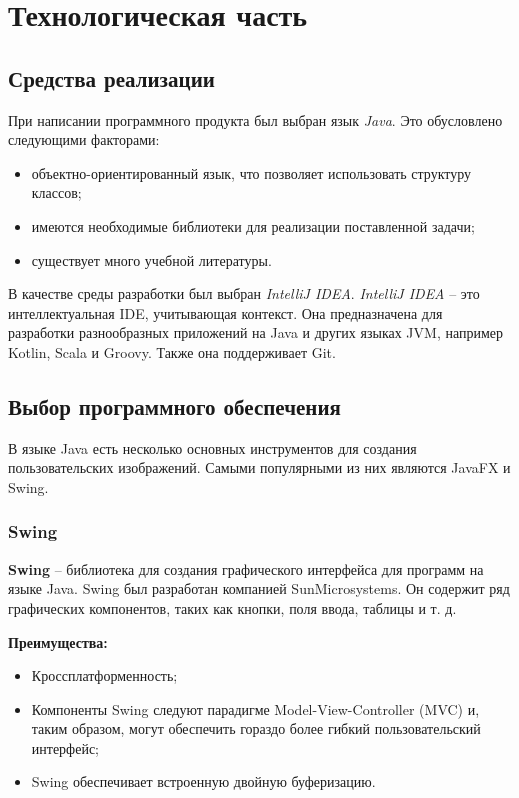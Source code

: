\chapter{Технологическая часть}

\section{Средства реализации}

При написании программного продукта был выбран язык \textit{Java}. Это обусловлено следующими факторами:

\begin{itemize}
    \item объектно-ориентированный язык, что позволяет использовать структуру классов;
    \item имеются необходимые библиотеки для реализации поставленной задачи;
    \item существует много учебной литературы.
\end{itemize}

В качестве среды разработки был выбран \textit{IntelliJ IDEA}. \textit{IntelliJ IDEA} -- это интеллектуальная IDE, учитывающая контекст. Она предназначена для разработки разнообразных приложений на Java и других языках JVM, например Kotlin, Scala и Groovy. Также она поддерживает Git.

\section{Выбор программного обеспечения}

В языке Java есть несколько основных инструментов для создания пользовательских изображений. Самыми популярными из них являются JavaFX и Swing.

\subsection{Swing}

\textbf{Swing} -- библиотека для создания графического интерфейса для программ на языке Java. Swing был разработан компанией SunMicrosystems. Он содержит ряд графических компонентов, таких как кнопки, поля ввода, таблицы и т. д.

\textbf{Преимущества:} 
\begin{itemize}
	\item Кроссплатформенность;
	\item Компоненты Swing следуют парадигме Model-View-Controller (MVC) и, таким образом, могут обеспечить гораздо более гибкий пользовательский интерфейс;
	\item Swing обеспечивает встроенную двойную буферизацию.
\end{itemize}

